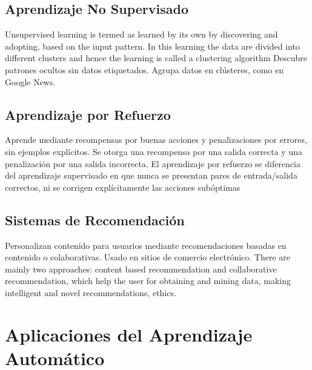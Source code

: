 \documentclass[12pt]{article}
\begin{document}
\subsection{Aprendizaje No Supervisado}
Unsupervised learning is termed as learned by its own by discovering and adopting, based on the input pattern. In this  learning the data are divided into different clusters and hence the learning is called a clustering algorithm Descubre patrones ocultos sin datos etiquetados. Agrupa datos en cl\'usteres, como en Google News.

\subsection{Aprendizaje por Refuerzo}
Aprende mediante recompensas por buenas acciones y penalizaciones por errores, sin ejemplos expl\'icitos. Se otorga una recompensa por una salida correcta y una penalización por una salida incorrecta. El aprendizaje por refuerzo se diferencia del aprendizaje supervisado en que nunca se presentan pares de entrada/salida correctos, ni se corrigen explícitamente las acciones subóptimas

\subsection{Sistemas de Recomendaci\'on}
Personalizan contenido para usuarios mediante recomendaciones basadas en contenido o colaborativas. Usado en sitios de comercio electr\'onico. There are mainly two approaches: content based recommendation and collaborative recommendation, which help the user for obtaining and mining data, making intelligent and novel recommendations, ethics. 

\section{Aplicaciones del Aprendizaje Autom\'atico}
\end{document}
